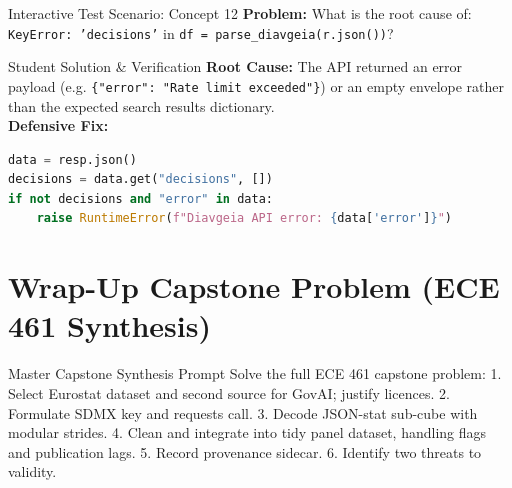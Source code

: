 \documentclass[11pt,a4paper]{article}
\begin{document}
\begin{testbox}{Interactive Test Scenario: Concept 12}
\textbf{Problem:} What is the root cause of:
\texttt{KeyError: 'decisions'} in \texttt{df = parse\_diavgeia(r.json())}?
\end{testbox}

\begin{evalbox}{Student Solution \& Verification}
\textbf{Root Cause:} The API returned an error payload (e.g. \texttt{\{"error": "Rate limit exceeded"\}}) or an empty envelope rather than the expected search results dictionary.\\
\textbf{Defensive Fix:}
\begin{lstlisting}[language=Python]
data = resp.json()
decisions = data.get("decisions", [])
if not decisions and "error" in data:
    raise RuntimeError(f"Diavgeia API error: {data['error']}")
\end{lstlisting}
\end{evalbox}

\newpage
\section{Wrap-Up Capstone Problem (ECE 461 Synthesis)}

\begin{promptbox}{Master Capstone Synthesis Prompt}
Solve the full ECE 461 capstone problem:
1. Select Eurostat dataset and second source for GovAI; justify licences.
2. Formulate SDMX key and requests call.
3. Decode JSON-stat sub-cube with modular strides.
4. Clean and integrate into tidy panel dataset, handling flags and publication lags.
5. Record provenance sidecar.
6. Identify two threats to validity.
\end{promptbox}
\end{document}

